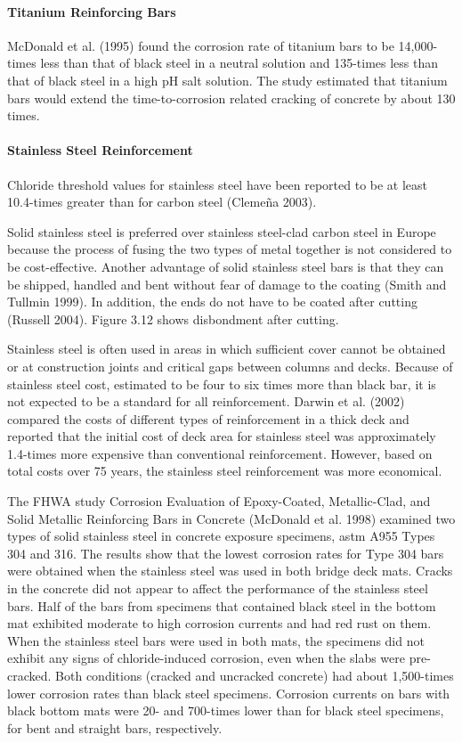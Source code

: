 \paragraph{Titanium Reinforcing Bars}
McDonald et al. (1995) found the corrosion rate of titanium bars to be 14,000-times less than that of black steel
in a neutral solution and 135-times less than that of black steel in a high pH salt solution. The study estimated that
titanium bars would extend the time-to-corrosion related cracking of concrete by about 130 times.

\paragraph{Stainless Steel Reinforcement}
Chloride threshold values for stainless steel have been reported to be at least 10.4-times greater than for carbon
steel (Clemeña 2003).

Solid stainless steel is preferred over stainless steel-clad carbon steel in Europe because the process of fusing the
two types of metal together is not considered to be cost-effective. Another advantage of solid stainless steel bars is
that they can be shipped, handled and bent without fear of damage to the coating (Smith and Tullmin 1999). In
addition, the ends do not have to be coated after cutting (Russell 2004). Figure 3.12 shows disbondment after
cutting.

Stainless steel is often used in areas in which sufficient cover cannot be obtained or at construction joints and
critical gaps between columns and decks. Because of stainless steel cost, estimated to be four to six times more than
black bar, it is not expected to be a standard for all reinforcement. Darwin et al. (2002) compared the costs of
different types of reinforcement in a thick deck and reported that the initial cost of deck area for stainless steel was
approximately 1.4-times more expensive than conventional reinforcement. However, based on total costs over 75
years, the stainless steel reinforcement was more economical.

The FHWA study Corrosion Evaluation of Epoxy-Coated, Metallic-Clad, and Solid Metallic Reinforcing Bars in
Concrete (McDonald et al. 1998) examined two types of solid stainless steel in concrete exposure specimens, \acrshort*{astm}
A955 Types 304 and 316. The results show that the lowest corrosion rates for Type 304 bars were obtained when the stainless steel was used in both bridge deck mats. Cracks in the concrete did not appear to affect the performance of
the stainless steel bars. Half of the bars from specimens that contained black steel in the bottom mat exhibited
moderate to high corrosion currents and had red rust on them. When the stainless steel bars were used in both mats,
the specimens did not exhibit any signs of chloride-induced corrosion, even when the slabs were pre-cracked. Both
conditions (cracked and uncracked concrete) had about 1,500-times lower corrosion rates than black steel specimens.
Corrosion currents on bars with black bottom mats were 20- and 700-times lower than for black steel specimens, for
bent and straight bars, respectively.

